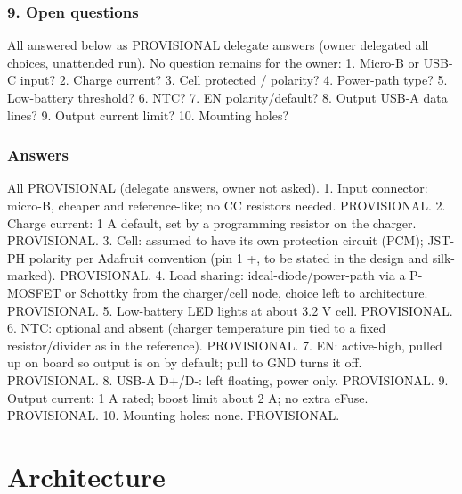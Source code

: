 \documentclass[11pt]{article}
\begin{document}
\subsubsection*{9. Open questions}
All answered below as PROVISIONAL delegate answers (owner delegated all choices, unattended run). No question remains for the owner: 1. Micro-B or USB-C input? 2. Charge current? 3. Cell protected / polarity? 4. Power-path type? 5. Low-battery threshold? 6. NTC? 7. EN polarity/default? 8. Output USB-A data lines? 9. Output current limit? 10. Mounting holes?

\subsubsection*{Answers}
All PROVISIONAL (delegate answers, owner not asked). 1. Input connector: micro-B, cheaper and reference-like; no CC resistors needed. PROVISIONAL. 2. Charge current: 1 A default, set by a programming resistor on the charger. PROVISIONAL. 3. Cell: assumed to have its own protection circuit (PCM); JST-PH polarity per Adafruit convention (pin 1 +, to be stated in the design and silk-marked). PROVISIONAL. 4. Load sharing: ideal-diode/power-path via a P-MOSFET or Schottky from the charger/cell node, choice left to architecture. PROVISIONAL. 5. Low-battery LED lights at about 3.2 V cell. PROVISIONAL. 6. NTC: optional and absent (charger temperature pin tied to a fixed resistor/divider as in the reference). PROVISIONAL. 7. EN: active-high, pulled up on board so output is on by default; pull to GND turns it off. PROVISIONAL. 8. USB-A D+/D-: left floating, power only. PROVISIONAL. 9. Output current: 1 A rated; boost limit about 2 A; no extra eFuse. PROVISIONAL. 10. Mounting holes: none. PROVISIONAL.

\section{Architecture}
\end{document}
